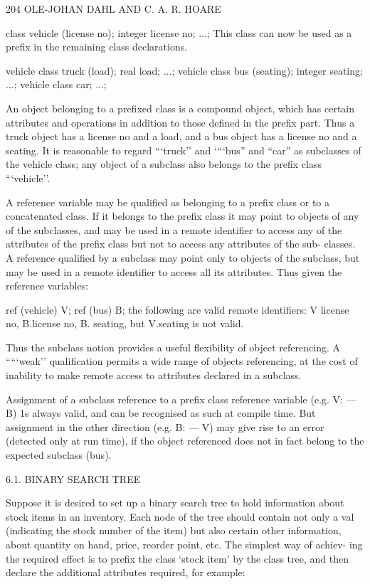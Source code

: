 {{{{{		204 OLE-JOHAN DAHL AND C. A. R. HOARE
		
		class vehicle (license no); integer license no; ...; This class can now be used as a prefix in the remaining class declarations.
		
		vehicle class truck (load); real load; ...; vehicle class bus (seating); integer seating; ...; vehicle class car; ...;
		
		An object belonging to a prefixed class is a compound object, which has certain attributes and operations in addition to those defined in the prefix part. Thus a truck object has a license no and a load, and a bus object has a license no and a seating. It is reasonable to regard “‘truck’’ and ‘“‘bus” and “car” as subclasses of the vehicle class; any object of a subclass also belongs to the prefix class “‘vehicle’’.
		
		A reference variable may be qualified as belonging to a prefix class or to a concatenated class. If it belongs to the prefix class it may point to objects of any of the subclasses, and may be used in a remote identifier to access any of the attributes of the prefix class but not to access any attributes of the sub- classes. A reference qualified by a subclass may point only to objects of the subclass, but may be used in a remote identifier to access all its attributes. Thus given the reference variables:
		
		ref (vehicle) V; ref (bus) B; the following are valid remote identifiers: V license no, B.license no, B. seating, but V.seating is not valid.
		
		Thus the subclass notion provides a useful flexibility of object referencing. A ““‘weak’’ qualification permits a wide range of objects referencing, at the cost of inability to make remote access to attributes declared in a subclass.
		
		Assignment of a subclass reference to a prefix class reference variable (e.g. V: — B) 1s always valid, and can be recognised as such at compile time. But assignment in the other direction (e.g. B: — V) may give rise to an error (detected only at run time), if the object referenced does not in fact belong to the expected subclass (bus).
		
		6.1. BINARY SEARCH TREE
		
		Suppose it is desired to set up a binary search tree to hold information about stock items in an inventory. Each node of the tree should contain not only a val (indicating the stock number of the item) but also certain other information, about quantity on hand, price, reorder point, etc. The simplest way of achiev- ing the required effect is to prefix the class ‘stock item’ by the class tree, and then declare the additional attributes required, for example:
		
}}}}}
